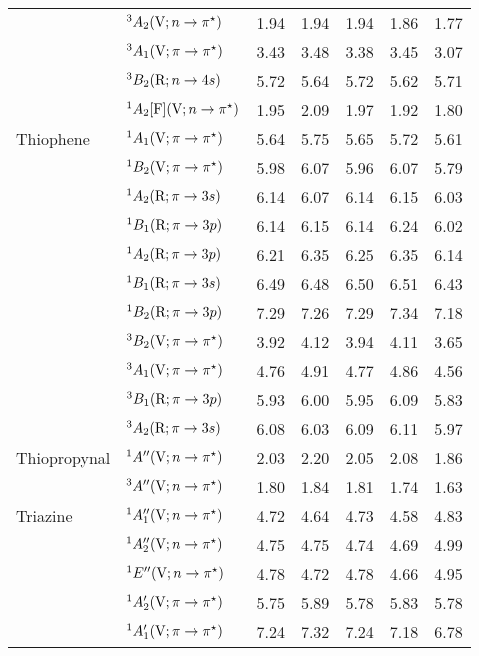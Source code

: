 \begin{tabular}{p{3.5cm}p{3.3cm}c|cccc}
        &$^3A_2 (\mathrm{V};n \rightarrow \pi^\star)$ 					&1.94	&1.94	&1.94	&1.86	&1.77	\\
        &$^3A_1 (\mathrm{V};\pi \rightarrow \pi^\star)$				& 3.43	&3.48	&3.38	&3.45	&3.07 	\\
        &$^3B_2 (\mathrm{R};n \rightarrow 4s)$ 					&5.72	&5.64	&5.72	&5.62	&5.71	\\
        &$^1A_2 [\mathrm{F}] (\mathrm{V};n \rightarrow \pi^\star)$				&1.95	&2.09	&1.97	&1.92	&1.80	\\
  Thiophene	&$^1A_1 (\mathrm{V}; \pi \rightarrow \pi^\star)$				& 5.64	&5.75	&5.65	&5.72	&5.61 \\	
        &$^1B_2 (\mathrm{V}; \pi \rightarrow \pi^\star)$				& 5.98	&6.07	&5.96	&6.07	&5.79 \\	
        &$^1A_2 (\mathrm{R}; \pi \rightarrow 3s)$				& 6.14	&6.07	&6.14	&6.15	&6.03 \\	
        &$^1B_1 (\mathrm{R}; \pi \rightarrow 3p)$				& 6.14	&6.15	&6.14	&6.24	&6.02 \\	
        &$^1A_2 (\mathrm{R}; \pi \rightarrow 3p)$				& 6.21	&6.35	&6.25	&6.35	&6.14 \\	
        &$^1B_1 (\mathrm{R}; \pi \rightarrow 3s)$				& 6.49	&6.48	&6.50	&6.51	&6.43 \\	
        &$^1B_2 (\mathrm{R}; \pi \rightarrow 3p)$				& 7.29 	&7.26	&7.29	&7.34	&7.18 \\ 	
        &$^3B_2 (\mathrm{V}; \pi \rightarrow \pi^\star)$				& 3.92	&4.12	&3.94	&4.11	&3.65 \\	
        &$^3A_1 (\mathrm{V}; \pi \rightarrow \pi^\star)$				& 4.76	&4.91	&4.77	&4.86	&4.56 \\	
        &$^3B_1 (\mathrm{R}; \pi \rightarrow 3p)$				& 5.93	&6.00	&5.95	&6.09	&5.83 \\	
        &$^3A_2 (\mathrm{R}; \pi \rightarrow 3s)$				& 6.08	&6.03	&6.09	&6.11	&5.97 \\	
  Thiopropynal	&$^1A^{\prime\prime}  (\mathrm{V}; n \rightarrow \pi^\star)$					& 2.03	&2.20	&2.05	&2.08	&1.86 \\	
        &$^3A^{\prime\prime}   (\mathrm{V}; n \rightarrow \pi^\star)$					& 1.80	&1.84	&1.81	&1.74	&1.63 \\	
  Triazine		&$^1A_1^{\prime\prime} (\mathrm{V}; n \rightarrow \pi^\star)$				& 4.72	&4.64	&4.73	&4.58	&4.83 \\	
        &$^1A_2^{\prime\prime} (\mathrm{V}; n \rightarrow \pi^\star)$				& 4.75	&4.75	&4.74	&4.69	&4.99 \\	
        &$^1E^{\prime\prime} (\mathrm{V}; n \rightarrow \pi^\star)$					& 4.78	&4.72	&4.78	&4.66	&4.95 \\	
        &$^1A_2^\prime (\mathrm{V}; \pi \rightarrow \pi^\star)$				& 5.75	&5.89	&5.78	&5.83	&5.78 \\	
        &$^1A_1^\prime (\mathrm{V}; \pi \rightarrow \pi^\star)$				& 7.24	&7.32	&7.24	&7.18	&6.78 \\	

\end{tabular}

